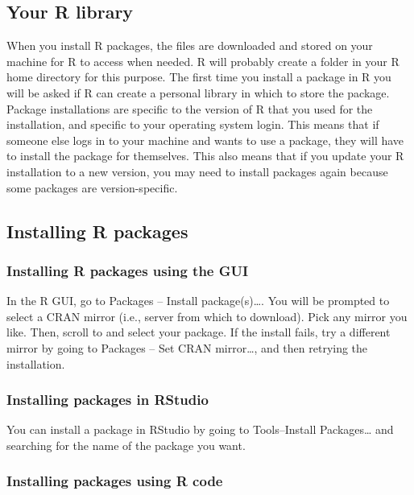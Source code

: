 \documentclass[
  13,
  letterpaper,
]{report}
\begin{document}
\subsection{Your R library}\label{sec-02-pack-lib}

When you install R packages, the files are downloaded and stored on your
machine for R to access when needed. R will probably create a folder in
your R home directory for this purpose. The first time you install a
package in R you will be asked if R can create a personal library in
which to store the package. Package installations are specific to the
version of R that you used for the installation, and specific to your
operating system login. This means that if someone else logs in to your
machine and wants to use a package, they will have to install the
package for themselves. This also means that if you update your R
installation to a new version, you may need to install packages again
because some packages are version-specific.

\subsection{Installing R packages}\label{sec-02-pack-install}

\subsubsection{Installing R packages using the
GUI}\label{installing-r-packages-using-the-gui}

In the R GUI, go to Packages -- Install package(s)\ldots. You will be
prompted to select a CRAN mirror (i.e., server from which to download).
Pick any mirror you like. Then, scroll to and select your package. If
the install fails, try a different mirror by going to Packages -- Set
CRAN mirror\ldots, and then retrying the installation.

\subsubsection{Installing packages in
RStudio}\label{installing-packages-in-rstudio}

You can install a package in RStudio by going to Tools--Install
Packages\ldots{} and searching for the name of the package you want.

\subsubsection{Installing packages using R
code}\label{installing-packages-using-r-code}
\end{document}
